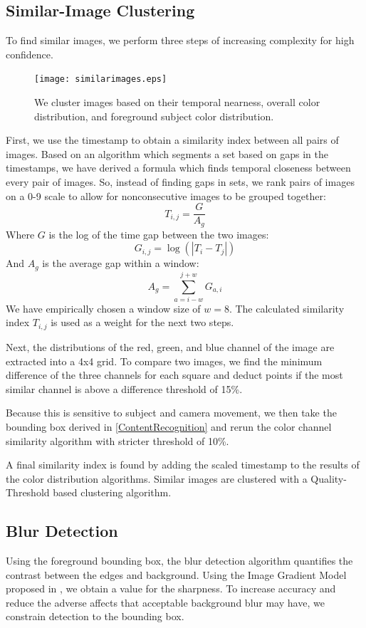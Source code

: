 \documentclass[10pt,twocolumn,letterpaper]{article}
\begin{document}
\subsection{Similar-Image Clustering}
To find similar images, we perform three steps of increasing complexity for high confidence.
\begin{figure}[t]
  \centering
    \texttt{[image: similarimages.eps]}
  \caption{We cluster images based on their temporal nearness, overall color distribution, and foreground subject color distribution.}
\end{figure}
First, we use the timestamp to obtain a similarity index between all pairs of images. Based on an algorithm which segments a set based on gaps in the timestamps\cite{1292402}, we have derived a formula which finds temporal closeness between every pair of images. So, instead of finding gaps in sets, we rank pairs of images on a 0-9 scale to allow for nonconsecutive images to be grouped together:
\[
T_{i,j}=\frac{G}{A_g}
\]
Where \(G\) is the log of the time gap between the two images:
\[
G_{i,j}=\log(|T_i-T_j|)
\]
And \(A_g\) is the average gap within a window:
\[
A_g=\displaystyle\sum\limits_{a={i-w}}^{j+w}G_{a,i}
\]
We have empirically chosen a window size of \(w=8\).
The calculated similarity index \(T_{i,j}\) is used as a weight for the next two steps.

Next, the distributions of the red, green, and blue channel of the image are extracted into a 4x4 grid. To compare two images, we find the minimum difference of the three channels for each square and deduct points if the most similar channel is above a difference threshold of 15\%.

Because this is sensitive to subject and camera movement, we then take the bounding box derived in \ref{ContentRecognition} and rerun the color channel similarity algorithm with stricter threshold of 10\%.

A final similarity index is found by adding the scaled timestamp to the results of the color distribution algorithms. Similar images are clustered with a Quality-Threshold based clustering algorithm.

\subsection{Blur Detection}
Using the foreground bounding box, the blur detection algorithm quantifies the contrast between the edges and background. Using the Image Gradient Model proposed in \cite{springerlink:10.1007/978-3-540-77409-9_26}, we obtain a value for the sharpness. To increase accuracy and reduce the adverse affects that acceptable background blur may have, we constrain detection to the bounding box.
\end{document}
